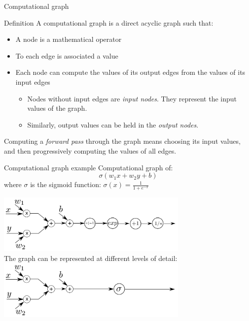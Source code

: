 \documentclass[xcolor=pdftex,dvipsnames,table,mathserif]{beamer}
\begin{document}
\begin{frame}{Computational graph}

\begin{block}{Definition}
  A computational graph is a direct acyclic graph such that:
  \begin{itemize}
  \item A node is a mathematical operator
  \item To each edge is associated a value
  \item Each node can compute the values of its output edges from the values of its input edges
    \begin{itemize}
    \item Nodes without input edges are \emph{input nodes}. They represent the input values of the graph.
    \item Similarly, output values can be held in the \emph{output nodes}.
    \end{itemize}
  \end{itemize}
\end{block}

Computing a \emph{forward pass} through the graph means choosing its input values, and then progressively computing the values of all edges.


\end{frame}


\begin{frame}{Computational graph example}
  Computational graph of:
  \[
  \sigma(w_1x + w_2y + b)
  \]
  where $\sigma$ is the sigmoid function: $\sigma(x) = \frac{1}{1 + e^{-x}}$

\vspace{3em}
\pause

  \centering
  \includegraphics[width=0.7\textwidth]{comp_graph2}\\
  \pause
  The graph can be represented at different levels of detail:
  \includegraphics[width=0.7\textwidth]{comp_graph}

\end{frame}
\end{document}
